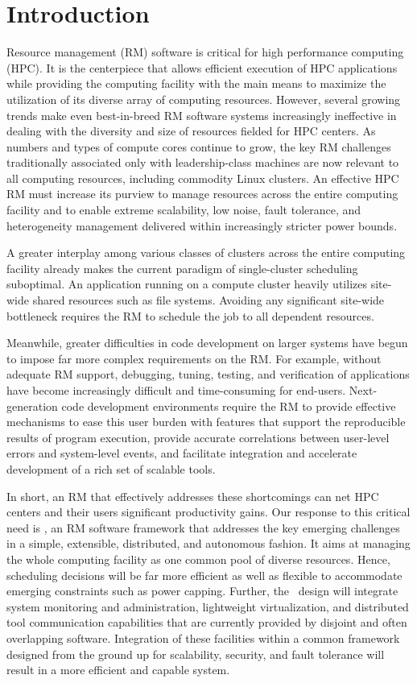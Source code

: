 \section{Introduction}

Resource management (RM) software is critical
for high performance computing (HPC).
It is the centerpiece that allows efficient
execution of HPC applications while providing
the computing facility with the main means
to maximize the utilization of its diverse array of computing
resources.
However, several growing trends make even
best-in-breed RM software systems increasingly ineffective
in dealing with the diversity and size of resources fielded for HPC centers.
As numbers and types of compute cores
continue to grow, the key RM challenges traditionally associated only
with leadership-class machines are now
relevant to all computing resources, including
commodity Linux clusters. An effective HPC RM must increase
its purview to manage resources across the entire
computing facility and to enable extreme scalability,
low noise, fault tolerance,
and heterogeneity management delivered within increasingly
stricter power bounds.

A greater interplay among various classes
of clusters across the entire computing facility already 
makes the current paradigm of single-cluster scheduling
suboptimal. An application running on a compute
cluster heavily utilizes site-wide shared resources
such as file systems.
Avoiding any significant site-wide bottleneck
requires the RM to schedule the job to all dependent
resources.

Meanwhile, greater difficulties in code development
on larger systems have begun to impose far more complex
requirements on the RM. For example, without adequate
RM support, debugging, tuning, testing, and verification
of applications have become increasingly difficult
and time-consuming for end-users.
Next-generation code development environments
require the RM to provide effective mechanisms
to ease this user burden with features that support the reproducible results of program execution,
provide accurate correlations between user-level errors
and system-level events,
and facilitate integration and accelerate development of a rich set of scalable tools.

In short, an RM that effectively
addresses these shortcomings can net HPC centers
and their users significant productivity gains.
Our response to this critical need is \flux,
an RM software framework that addresses the key emerging
challenges in a simple, extensible, distributed,
and autonomous fashion.
It aims at managing the whole computing facility
as one common pool of diverse resources.
Hence, scheduling decisions will be far more efficient
as well as flexible to accommodate emerging constraints
such as power capping.
Further, the \flux\ design will integrate system monitoring and
administration, lightweight virtualization, 
and distributed tool communication capabilities 
that are currently provided by disjoint
and often overlapping software. 
Integration of these facilities within a common framework
designed from the ground up for scalability, security,
and fault tolerance will result in a more efficient
and capable system.

